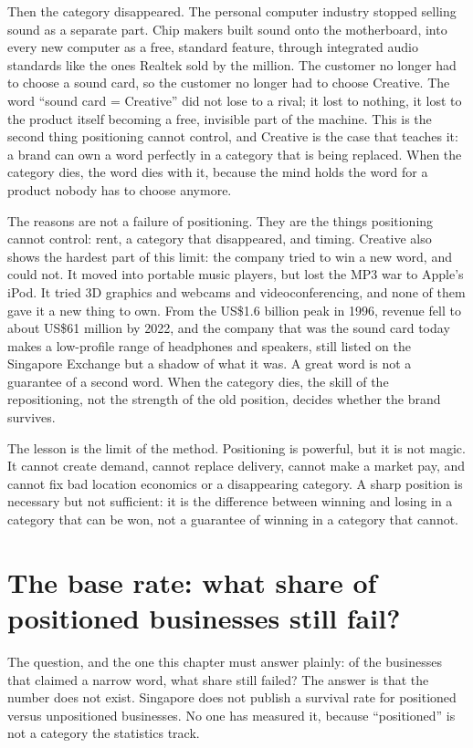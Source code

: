 \documentclass[10pt,twoside,openany]{memoir}
\newcommand{\needspacehead}{\needspace{4\baselineskip}}
\let\oldsection\section
\renewcommand{\section}{\needspacehead\oldsection}
\begin{document}
{Then the category disappeared. The personal computer industry stopped
selling sound as a separate part. Chip makers built sound onto the
motherboard, into every new computer as a free, standard feature,
through integrated audio standards like the ones Realtek sold by the
million. The customer no longer had to choose a sound card, so the
customer no longer had to choose Creative. The word ``sound card =
Creative'' did not lose to a rival; it lost to nothing, it lost to the
product itself becoming a free, invisible part of the machine. This is
the second thing positioning cannot control, and Creative is the case
that teaches it: a brand can own a word perfectly in a category that is
being replaced. When the category dies, the word dies with it, because
the mind holds the word for a product nobody has to choose anymore.

The reasons are not a failure of positioning. They are the things
positioning cannot control: rent, a category that disappeared, and
timing. Creative also shows the hardest part of this limit: the company
tried to win a new word, and could not. It moved into portable music
players, but lost the MP3 war to Apple's iPod. It tried 3D graphics and
webcams and videoconferencing, and none of them gave it a new thing to
own. From the US\$1.6 billion peak in 1996, revenue fell to about US\$61
million by 2022, and the company that was the sound card today makes a
low-profile range of headphones and speakers, still listed on the
Singapore Exchange but a shadow of what it was. A great word is not a
guarantee of a second word. When the category dies, the skill of the
repositioning, not the strength of the old position, decides whether the
brand survives.

The lesson is the limit of the method. Positioning is powerful, but it
is not magic. It cannot create demand, cannot replace delivery, cannot
make a market pay, and cannot fix bad location economics or a
disappearing category. A sharp position is necessary but not sufficient:
it is the difference between winning and losing in a category that can
be won, not a guarantee of winning in a category that cannot.

\section{The base rate: what share of positioned businesses still
fail?}\label{the-base-rate-what-share-of-positioned-businesses-still-fail}

The question, and the one this chapter must answer plainly: of the
businesses that claimed a narrow word, what share still failed? The
answer is that the number does not exist. Singapore does not publish a
survival rate for positioned versus unpositioned businesses. No one has
measured it, because ``positioned'' is not a category the statistics
track.

}
\end{document}
